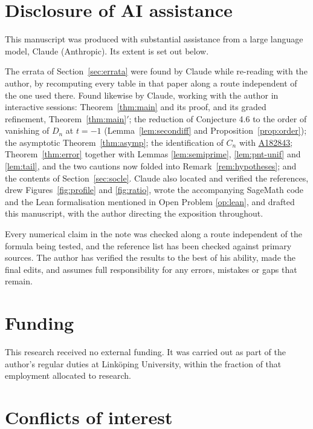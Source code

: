 \documentclass[a4paper,11pt,oneside,reqno]{amsart}
\theoremstyle{definition}
\theoremstyle{remark}
\theoremstyle{plain}
\newcommand{\seqnum}[1]{\href{https://oeis.org/#1}{\underline{#1}}}
\begin{document}
\section*{Disclosure of AI assistance}

This manuscript was produced with substantial assistance from a large language
model, Claude (Anthropic). Its extent is set out below.

The errata of Section~\ref{sec:errata} were found by Claude while re-reading
\cite{Snellman2000} with the author, by recomputing every table in that paper
along a route independent of the one used there. Found likewise by Claude,
working with the author in interactive sessions: Theorem~\ref{thm:main} and its
proof, and its graded refinement, Theorem~\ref{thm:main}\({}'\); the reduction of Conjecture 4.6 to the order of vanishing of \(D_n\) at
\(t = -1\) (Lemma~\ref{lem:secondiff} and Proposition~\ref{prop:order}); the
asymptotic Theorem~\ref{thm:asymp}; the identification of \(C_n\) with
\seqnum{A182843}; Theorem~\ref{thm:error} together with Lemmas
\ref{lem:semiprime}, \ref{lem:pnt-unif} and \ref{lem:tail}, and the two
cautions now folded into Remark~\ref{rem:hypotheses}; and
the contents of Section~\ref{sec:socle}. Claude also located and verified the
references, drew Figures~\ref{fig:profile} and \ref{fig:ratio}, wrote the accompanying
\textsf{SageMath} code and the Lean formalisation mentioned in Open Problem
\ref{op:lean}, and drafted this manuscript, with the author directing the
exposition throughout.

Every numerical claim in the note was checked along a route independent of the
formula being tested, and the reference list has been checked against primary
sources. The author has verified the results to the best of his ability, made
the final edits, and assumes full responsibility for any errors, mistakes or
gaps that remain.

\section*{Funding}

This research received no external funding. It was carried out as part of the
author's regular duties at Linköping University, within the fraction of that
employment allocated to research.

\section*{Conflicts of interest}
\end{document}

